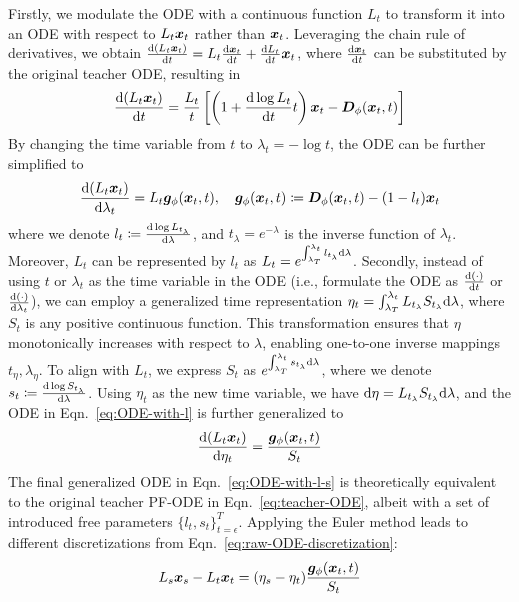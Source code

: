Firstly, we modulate the ODE with a continuous function $L_t$ to transform it into an ODE with respect to $L_t\bm{x}_t$ rather than $\bm{x}_t$. Leveraging the chain rule of derivatives, we obtain $\frac{\mathrm{d}(L_t\bm{x}_t)}{\mathrm{d} t}=L_t\frac{\mathrm{d} \bm{x}_t}{\mathrm{d} t}+\frac{\mathrm{d} L_t}{\mathrm{d} t}\bm{x}_t$, where $\frac{\mathrm{d} \bm{x}_t}{\mathrm{d} t}$ can be substituted by the original teacher ODE, resulting in
\begin{equation}
    \frac{\mathrm{d}(L_t\bm{x}_t)}{\mathrm{d} t}=\frac{L_t}{t}\left[\left(1+\frac{\mathrm{d}\log L_t}{\mathrm{d} t}t\right)\bm{x}_t-\bm{D}_\phi(\bm{x}_t,t)\right]
\end{equation}
By changing the time variable from $t$ to $\lambda_t=-\log t$, the ODE can be further simplified to
\begin{equation}
    \label{eq:ODE-with-l}
    \frac{\mathrm{d}(L_t\bm{x}_t)}{\mathrm{d} \lambda_t}=L_t\bm{g}_\phi(\bm{x}_t,t),\quad \bm{g}_\phi(\bm{x}_t,t)\coloneqq \bm{D}_\phi(\bm{x}_{t},t)-(1-l_{t})\bm{x}_{t}
\end{equation}
where we denote $l_t\coloneqq\frac{\mathrm{d} \log L_{t_\lambda}}{\mathrm{d}\lambda}$, and $t_\lambda=e^{-\lambda}$ is the inverse function of $\lambda_t$. Moreover, $L_t$ can be represented by $l_t$ as $L_t=e^{\int_{\lambda_T}^{\lambda_t}l_{t_\lambda}\mathrm{d}\lambda}$.
Secondly, instead of using $t$ or $\lambda_t$ as the time variable in the ODE (i.e., formulate the ODE as $\frac{\mathrm{d} (\cdot)}{\mathrm{d} t}$ or $\frac{\mathrm{d} (\cdot)}{\mathrm{d} \lambda_t}$), we can employ a generalized time representation $\eta_t=\int_{\lambda_T}^{\lambda_t} L_{t_{\lambda}}S_{t_{\lambda}}\mathrm{d}\lambda$, where $S_t$ is any positive continuous function. This transformation ensures that $\eta$ monotonically increases with respect to $\lambda$, enabling one-to-one inverse mappings $t_\eta,\lambda_\eta$. To align with $L_t$, we express $S_t$ as $e^{\int_{\lambda_T}^{\lambda_t}s_{t_\lambda}\mathrm{d}\lambda}$, where we denote $s_t\coloneqq\frac{\mathrm{d} \log S_{t_\lambda}}{\mathrm{d}\lambda}$. Using $\eta_t$ as the new time variable, we have $\mathrm{d}\eta=L_{t_{\lambda}}S_{t_{\lambda}}\mathrm{d}\lambda$, and the ODE in Eqn.~\eqref{eq:ODE-with-l} is further generalized to
\begin{equation}
\label{eq:ODE-with-l-s}
    \frac{\mathrm{d}(L_t\bm{x}_t)}{\mathrm{d} \eta_t}=\frac{\bm{g}_\phi(\bm{x}_t,t)}{S_t}
\end{equation}
The final generalized ODE in Eqn.~\eqref{eq:ODE-with-l-s} is theoretically equivalent to the original teacher PF-ODE in Eqn.~\eqref{eq:teacher-ODE}, albeit with a set of introduced free parameters $\{l_t,s_t\}_{t=\epsilon}^T$. Applying the Euler method leads to different discretizations from Eqn.~\eqref{eq:raw-ODE-discretization}:
\begin{equation}
\label{eq:generalize-discretization-not-rearranged}
    L_s\bm{x}_s-L_t\bm{x}_t=(\eta_s-\eta_t)\frac{\bm{g}_\phi(\bm{x}_t,t)}{S_t}
\end{equation}
